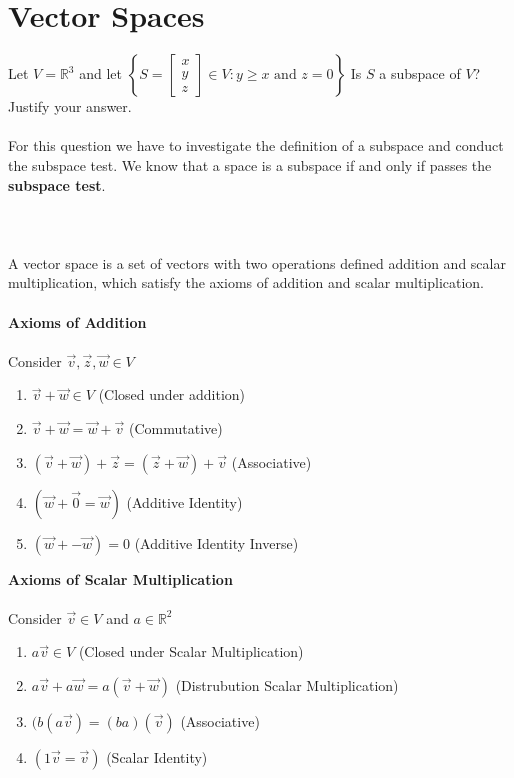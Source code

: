 \documentclass[12pt]{article}
\begin{document}
\section{Vector Spaces}
Let $V =  \mathbb{R}^3$ and let $\left\{S = \begin{bmatrix}x \\ y \\ z \end{bmatrix} \in V : y\geq x \text{ and } z = 0 \right\}$ Is $S$ a subspace of $V$? Justify your answer.
\\\\
For this question we have to investigate the definition of a subspace and conduct the subspace test. We know that a space is a subspace if and only if passes the \textbf{subspace test}. \\\\
\\\\
A vector space is a set of vectors with two operations defined addition and scalar multiplication, which satisfy the axioms of addition and scalar multiplication.
\\\\ \textbf{Axioms of Addition}
\\\\Consider $\vec{v}, \vec{z}, \vec{w} \in V$
\\ \begin{enumerate}
  \item $\vec{v}+ \vec{w} \in V$ (Closed under addition)
  \item $\vec{v}+ \vec{w} = \vec{w}+ \vec{v}$ (Commutative)
  \item $(\vec{v}+ \vec{w}) + \vec{z} = (\vec{z}+ \vec{w}) + \vec{v}$ (Associative)
  \item $(\vec{w} + \vec{0} = \vec{w})$ (Additive Identity)
  \item $(\vec{w} + -\vec{w})= 0$ (Additive Identity Inverse)
  \end{enumerate}
\textbf{Axioms of Scalar Multiplication}
\\\\Consider $\vec{v}\in V$ and $ a \in \mathbb{R}^2$
\\ \begin{enumerate}
  \item $a\vec{v} \in V$ (Closed under Scalar Multiplication)
  \item $a\vec{v}+ a\vec{w} = a(\vec{v}+ \vec{w})$ (Distrubution Scalar Multiplication)
  \item $(b(a\vec{v}) = (ba)(\vec{v})$ (Associative)
  \item $(1\vec{v} = \vec{v})$ (Scalar Identity)
  \end{enumerate}
\end{document}
